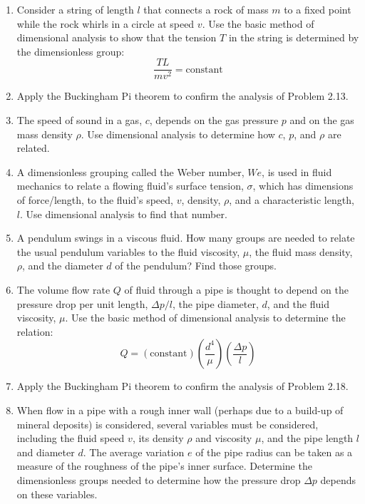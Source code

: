 \begin{enumerate}
    \item[\textbf{Problem 2.13.}] Consider a string of length $l$ that connects a rock of mass $m$ to a fixed point while the rock whirls in a circle at speed $v$. Use the basic method of dimensional analysis to show that the tension $T$ in the string is determined by the dimensionless group:
    \begin{equation}
        \frac{TL}{m v^2} = \text{constant}
    \end{equation}

    \item[\textbf{Problem 2.14.}] Apply the Buckingham Pi theorem to confirm the analysis of Problem 2.13.

    \item[\textbf{Problem 2.15.}] The speed of sound in a gas, $c$, depends on the gas pressure $p$ and on the gas mass density $\rho$. Use dimensional analysis to determine how $c$, $p$, and $\rho$ are related.

    \item[\textbf{Problem 2.16.}] A dimensionless grouping called the Weber number, $We$, is used in fluid mechanics to relate a flowing fluid's surface tension, $\sigma$, which has dimensions of force/length, to the fluid's speed, $v$, density, $\rho$, and a characteristic length, $l$. Use dimensional analysis to find that number.

    \item[\textbf{Problem 2.17.}] A pendulum swings in a viscous fluid. How many groups are needed to relate the usual pendulum variables to the fluid viscosity, $\mu$, the fluid mass density, $\rho$, and the diameter $d$ of the pendulum? Find those groups.

    \item[\textbf{Problem 2.18.}] The volume flow rate $Q$ of fluid through a pipe is thought to depend on the pressure drop per unit length, $\Delta p / l$, the pipe diameter, $d$, and the fluid viscosity, $\mu$. Use the basic method of dimensional analysis to determine the relation:
    \begin{equation}
        Q = (\text{constant}) \left(\frac{d^4}{\mu}\right) \left(\frac{\Delta p}{l}\right)
    \end{equation}

    \item[\textbf{Problem 2.19.}] Apply the Buckingham Pi theorem to confirm the analysis of Problem 2.18.

    \item[\textbf{Problem 2.20.}] When flow in a pipe with a rough inner wall (perhaps due to a build-up of mineral deposits) is considered, several variables must be considered, including the fluid speed $v$, its density $\rho$ and viscosity $\mu$, and the pipe length $l$ and diameter $d$. The average variation $e$ of the pipe radius can be taken as a measure of the roughness of the pipe's inner surface. Determine the dimensionless groups needed to determine how the pressure drop $\Delta p$ depends on these variables.


\end{enumerate}
